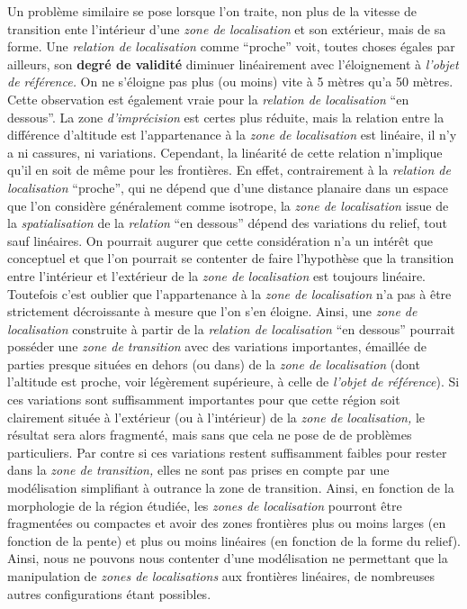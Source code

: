 
Un problème similaire se pose lorsque l'on traite, non plus de la
vitesse de transition ente l'intérieur d'une \emph{zone de
  localisation} et son extérieur, mais de sa forme. Une \emph{relation
  de localisation} comme \enquote{proche} voit, toutes choses égales
par ailleurs, son \textbf{degré de validité} diminuer linéairement
avec l'éloignement à \emph{l'objet de référence.} On ne s'éloigne pas
plus (ou moins) vite à 5 mètres qu'a 50 mètres. Cette observation est
également vraie pour la \emph{relation de localisation} \enquote{en
  dessous}. La zone \emph{d'imprécision} est certes plus réduite, mais
la relation entre la différence d'altitude est l'appartenance à la
\emph{zone de localisation} est linéaire, il n'y a ni cassures, ni
variations. Cependant, la linéarité de cette relation n'implique qu'il
en soit de même pour les frontières. En effet, contrairement à la
\emph{relation de localisation} \enquote{proche}, qui ne dépend que
d'une distance planaire dans un espace que l'on considère généralement
comme isotrope, la \emph{zone de localisation} issue de la
\emph{spatialisation} de la \emph{relation} \enquote{en dessous}
dépend des variations du relief, tout sauf linéaires. On pourrait
augurer que cette considération n'a un intérêt que conceptuel et que
l'on pourrait se contenter de faire l'hypothèse que la transition
entre l'intérieur et l'extérieur de la \emph{zone de localisation} est
toujours linéaire. Toutefois c'est oublier que l'appartenance à la
\emph{zone de localisation} n'a pas à être strictement décroissante à
mesure que l'on s'en éloigne. Ainsi, une \emph{zone de localisation}
construite à partir de la \emph{relation de localisation} \enquote{en
  dessous} pourrait posséder une \emph{zone de transition} avec des
variations importantes, émaillée de parties presque situées en dehors
(ou dans) de la \emph{zone de localisation} (\ie dont l'altitude est
proche, voir légèrement supérieure, à celle de \emph{l'objet de
  référence}). Si ces variations sont suffisamment importantes pour
que cette région soit clairement située à l'extérieur (ou à
l'intérieur) de la \emph{zone de localisation,} le résultat sera alors
fragmenté, mais sans que cela ne pose de de problèmes
particuliers. Par contre si ces variations restent suffisamment
faibles pour rester dans la \emph{zone de transition,} elles ne sont
pas prises en compte par une modélisation simplifiant à outrance la
zone de transition. Ainsi, en fonction de la morphologie de la région
étudiée, les \emph{zones de localisation} pourront être fragmentées ou
compactes et avoir des zones frontières plus ou moins larges (en
fonction de la pente) et plus ou moins linéaires (en fonction de la
forme du relief). Ainsi, nous ne pouvons nous contenter d'une
modélisation ne permettant que la manipulation de \emph{zones de
  localisations} aux frontières linéaires, de nombreuses autres
configurations étant possibles.

